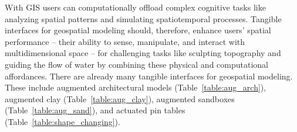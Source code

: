 \documentclass[prodmode,acmtochi]{acmsmall} %
\begin{document}

%
%
%
%
%
%
%


With GIS users can computationally offload complex cognitive tasks 
like analyzing spatial patterns and simulating spatiotemporal processes.
%
Tangible interfaces for geospatial modeling should, 
therefore, enhance users' spatial performance 
-- their ability to sense, manipulate, and interact with multidimensional space -- 
for challenging tasks 
like sculpting topography and guiding the flow of water
by combining these physical and computational affordances.
%
There are already many tangible interfaces for geospatial modeling.
%
These include 
augmented architectural models (Table~\ref{table:aug_arch}), 
augmented clay (Table~\ref{table:aug_clay}),  
augmented sandboxes (Table~\ref{table:aug_sand}), 
and actuated pin tables (Table~\ref{table:shape_changing}).
\end{document}
